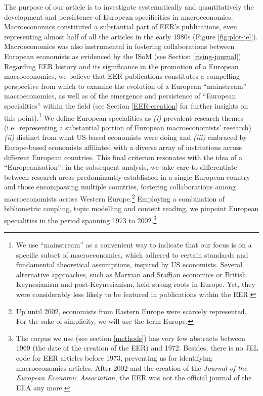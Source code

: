 \documentclass[
  12pt,
  onecolumn]{article}
\begin{document}
The purpose of our article is to investigate systematically and quantitatively the development and persistence of European specificities in macroeconomics. Macroeconomics constituted a substantial part of EER's publications, even representing almost half of all the articles in the early 1980s (Figure \ref{fig:plot-jel}). Macroeconomics was also instrumental in fostering collaborations between European economists as evidenced by the ISoM (see Section \ref{rising-journal}). Regarding EER history and its significance in the promotion of a European macroeconomics, we believe that EER publications constitutes a compelling perspective from which to examine the evolution of a European ``mainstream'' macroeconomics, as well as of the emergence and persistence of ``European specialities'' within the field (see Section \ref{EER-creation} for further insights on this point).\footnote{We use ``mainstream'' as a convenient way to indicate that our focus is on a specific subset of macroeconomics, which adhered to certain standards and fundamental theoretical assumptions, inspired by US economists. Several alternative approaches, such as Marxian and Sraffian economics or British Keynesianism and post-Keynesianism, held strong roots in Europe. Yet, they were considerably less likely to be featured in publications within the EER.} We define European specialities as \emph{(i)} prevalent research themes (i.e.~representing a substantial portion of European macroeconomists' research) \emph{(ii)} distinct from what US-based economists were doing and \emph{(iii)} embraced by Europe-based economists affiliated with a diverse array of institutions across different European countries. This final criterion resonates with the idea of a ``Europeanisation'': in the subsequent analysis, we take care to differentiate between research areas predominantly established in a single European country and those encompassing multiple countries, fostering collaborations among macroeconomists across Western Europe.\footnote{Up until 2002, economists from Eastern Europe were scarcely represented. For the sake of simplicity, we will use the term Europe.} Employing a combination of bibliometric coupling, topic modelling and content reading, we pinpoint European specialities in the period spanning 1973 to 2002.\footnote{The corpus we use (see section \ref{methods}) has very few abstracts between 1969 (the date of the creation of the EER) and 1972. Besides, there is no JEL code for EER articles before 1973, preventing us for identifying macroeconomics articles. After 2002 and the creation of the \emph{Journal of the European Economic Association}, the EER was not the official journal of the EEA any more.}
\end{document}

